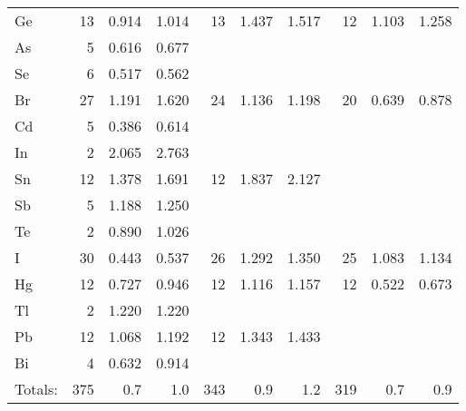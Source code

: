 \begin{table}
\begin{center}
\begin{tabular}{lrrrrrrrrr}
 Ge &  13 &    0.914 &    1.014 &  13 &    1.437 &    1.517 &  12 &    1.103 &    1.258 \\
 As &   5 &    0.616 &    0.677 &     &          &          &     &          &          \\
 Se &   6 &    0.517 &    0.562 &     &          &          &     &          &          \\
 Br &  27 &    1.191 &    1.620 &  24 &    1.136 &    1.198 &  20 &    0.639 &    0.878 \\
 Cd &   5 &    0.386 &    0.614 &     &          &          &     &          &          \\
 In &   2 &    2.065 &    2.763 &     &          &          &     &          &          \\
 Sn &  12 &    1.378 &    1.691 &  12 &    1.837 &    2.127 &     &          &          \\
 Sb &   5 &    1.188 &    1.250 &     &          &          &     &          &          \\
 Te &   2 &    0.890 &    1.026 &     &          &          &     &          &          \\
  I &  30 &    0.443 &    0.537 &  26 &    1.292 &    1.350 &  25 &    1.083 &    1.134 \\
 Hg &  12 &    0.727 &    0.946 &  12 &    1.116 &    1.157 &  12 &    0.522 &    0.673 \\
 Tl &   2 &    1.220 &    1.220 &     &          &          &     &          &          \\
 Pb &  12 &    1.068 &    1.192 &  12 &    1.343 &    1.433 &     &          &          \\
 Bi &   4 &    0.632 &    0.914 &     &          &          &     &          &          \\
\hline
Totals: & 375  & 0.7 &      1.0 & 343 &     0.9  &      1.2 & 319 &      0.7 &  0.9     \\ 
\hline
\end{tabular}
\end{center}
\end{table}
